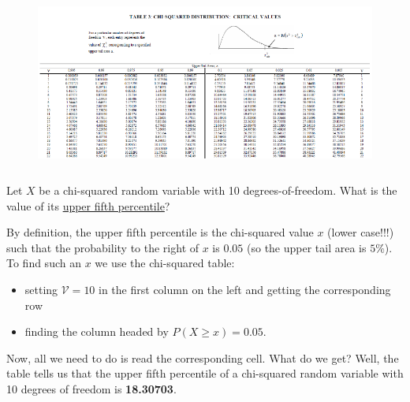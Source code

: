 \documentclass[notes=show,smaller,handout]{beamer}\usepackage[]{graphicx}\usepackage[]{color}
\begin{document}
\begin{frame}{\subsecname}



\begin{figure}[ptb]\centering
\includegraphics[height=2.2649in, width=4.9658in]{img/chisq_table__3.pdf}%
\end{figure}

\end{frame}%

\begin{frame}{\subsecname}


\begin{example}

Let $X$ be a chi-squared random variable with 10 degrees-of-freedom. What is the value of its \underline{upper fifth percentile}? \bigskip

By definition, the upper fifth percentile is the chi-squared value $x$ (lower case!!!) such that the probability to the right of $x$ is $0.05$ (so the upper tail area is $5\%$).  To find such an $x$ we use the chi-squared table: \medskip
\begin{itemize}
\item setting $\mathcal{V} = 10$ in the first column on the left and getting the corresponding row \medskip
\item finding the column headed by $P(X \geq x) = 0.05$. \medskip
\end{itemize}

Now, all we need to do is read the corresponding cell. What do we get? Well, the table tells us that the upper fifth percentile of a chi-squared random variable with 10 degrees of freedom is \textbf{18.30703}.
\end{example}
\end{frame}

\end{document}
